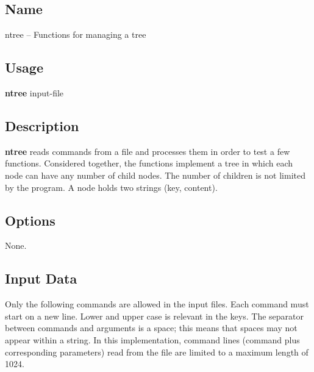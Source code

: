 %
%

\subsection*{Name}

ntree -- Functions for managing a tree

\subsection*{Usage}
{\bf ntree} input-file

\subsection*{Description}
{\bf ntree} reads commands from a file and processes them in order to
test a few functions. 
Considered together, the functions implement a tree in which each node
can have any number of child nodes.
The number of children is not limited by the program.
A node holds two strings (key, content).

\subsection*{Options}
None.

\subsection*{Input Data}
Only the following commands are allowed in the input files.
Each command must start on a new line.
Lower and upper case is relevant in the keys.
The separator between commands and arguments is a space; this means that
spaces may not appear within a string.
In this implementation, command lines (command plus corresponding
parameters) read from the file are limited to a maximum length of
1024. 


